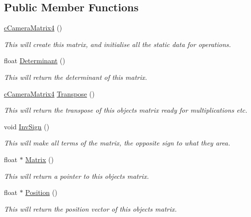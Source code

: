 \subsection*{Public Member Functions}
\begin{DoxyCompactItemize}
\item 
\hyperlink{classc_camera_matrix4_a99df6d312702e5474c5fedad42c95026}{cCameraMatrix4} ()
\begin{DoxyCompactList}\small\item\em This will create this matrix, and initialise all the static data for operations. \item\end{DoxyCompactList}\item 
float \hyperlink{classc_camera_matrix4_a4f3456fc67fbd37692a8daa9d11d5fc6}{Determinant} ()
\begin{DoxyCompactList}\small\item\em This will return the determinant of this matrix. \item\end{DoxyCompactList}\item 
\hyperlink{classc_camera_matrix4}{cCameraMatrix4} \hyperlink{classc_camera_matrix4_ac1fa4dd9add669a8faecd0ca79713278}{Transpose} ()
\begin{DoxyCompactList}\small\item\em This will return the transpose of this objects matrix ready for multiplications etc. \item\end{DoxyCompactList}\item 
void \hyperlink{classc_camera_matrix4_a97d111c444dd87ecec278e585fe058a7}{InvSign} ()
\begin{DoxyCompactList}\small\item\em This will make all terms of the matrix, the opposite sign to what they area. \item\end{DoxyCompactList}\item 
float $\ast$ \hyperlink{classc_camera_matrix4_ad8aad043cd8c21d5323b56cbcc90ef78}{Matrix} ()
\begin{DoxyCompactList}\small\item\em This will return a pointer to this objects matrix. \item\end{DoxyCompactList}\item 
float $\ast$ \hyperlink{classc_camera_matrix4_a89fba901320f6dda9a6b92bac09db915}{Position} ()
\begin{DoxyCompactList}\small\item\em This will return the position vector of this objects matrix. \item\end{DoxyCompactList}\item 

\end{DoxyCompactItemize}
